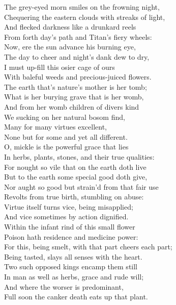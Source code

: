  
\begin{speech}
The grey-eyed morn smiles on the frowning night,
\\
Chequering the eastern clouds with streaks of light, \\
And flecked darkness like a drunkard reels \\
From forth day's path and Titan's fiery wheels: \\
Now, ere the sun advance his burning eye, \\
The day to cheer and night's dank dew to dry, \\
I must up-fill this osier cage of ours \\
With baleful weeds and precious-juiced flowers. \\
The earth that's nature's mother is her tomb; \\
What is her burying grave that is her womb, \\
And from her womb children of divers kind \\
We sucking on her natural bosom find, \\
Many for many virtues excellent, \\
None but for some and yet all different. \\
O, mickle is the powerful grace that lies \\
In herbs, plants, stones, and their true qualities: \\
For nought so vile that on the earth doth live \\
But to the earth some special good doth give, \\
Nor aught so good but strain'd from that fair use \\
Revolts from true birth, stumbling on abuse: \\
Virtue itself turns vice, being misapplied; \\
And vice sometimes by action dignified. \\
Within the infant rind of this small flower \\
Poison hath residence and medicine power: \\
For this, being smelt, with that part cheers each part; \\
Being tasted, slays all senses with the heart. \\
Two such opposed kings encamp them still \\
In man as well as herbs, grace and rude will; \\
And where the worser is predominant, \\
Full soon the canker death eats up that plant. 
\\
\end{speech}
